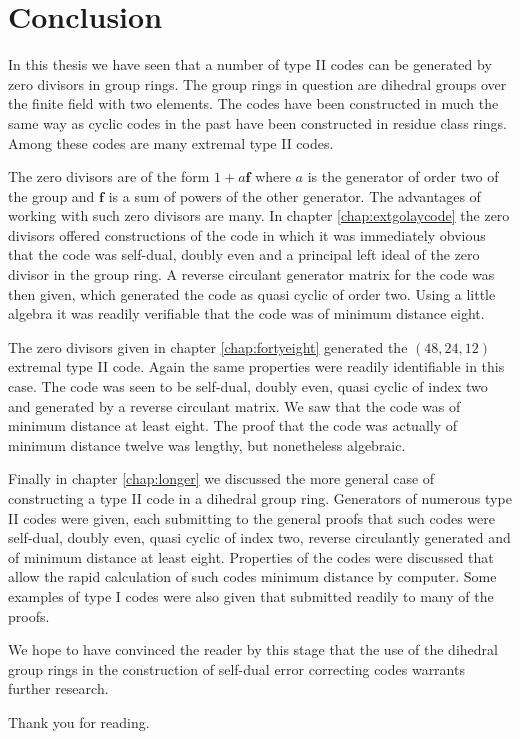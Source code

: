 \chapter*{Conclusion}
In this thesis we have seen that a number of type II codes can be generated by zero divisors in group rings.
The group rings in question are dihedral groups over the finite field with two elements.
The codes have been constructed in much the same way as cyclic codes in the past have been constructed in residue class rings.
Among these codes are many extremal type II codes.

The zero divisors are of the form $1+a \mathbf{f}$ where $a$ is the generator of order two of the group and $\mathbf{f}$ is a sum of powers of the other generator.
The advantages of working with such zero divisors are many.
In chapter \ref{chap:extgolaycode} the zero divisors offered constructions of the code in which it was immediately obvious that the code was self-dual, doubly even and a principal left ideal of the zero divisor in the group ring.
A reverse circulant generator matrix for the code was then given, which generated the code as quasi cyclic of order two.
Using a little algebra it was readily verifiable that the code was of minimum distance eight.

The zero divisors given in chapter \ref{chap:fortyeight} generated the $(48,24,12)$ extremal type II code.
Again the same properties were readily identifiable in this case.
The code was seen to be self-dual, doubly even, quasi cyclic of index two and generated by a reverse circulant matrix.
We saw that the code was of minimum distance at least eight.
The proof that the code was actually of minimum distance twelve was lengthy, but nonetheless algebraic.

Finally in chapter \ref{chap:longer} we discussed the more general case of constructing a type II code in a dihedral group ring.
Generators of numerous type II codes were given, each submitting to the general proofs that such codes were self-dual, doubly even, quasi cyclic of index two, reverse circulantly generated and of minimum distance at least eight.
Properties of the codes were discussed that allow the rapid calculation of such codes minimum distance by computer.
Some examples of type I codes were also given that submitted readily to many of the proofs.

We hope to have convinced the reader by this stage that the use of the dihedral group rings in the construction of self-dual error correcting codes warrants further research.

\begin{flushleft}
Thank you for reading.
\end{flushleft}

